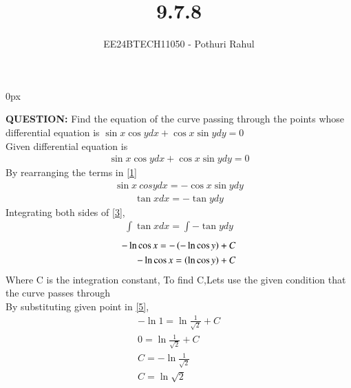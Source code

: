 \documentclass[journal]{IEEEtran}
\begin{document}

\vspace{3cm}
\parindent 0px

\title{9.7.8}
\author{EE24BTECH11050 - Pothuri Rahul}
{\let\newpage\relax\maketitle}

\renewcommand{\thefigure}{\theenumi}
\renewcommand{\thetable}{\theenumi}
\setlength{\intextsep}{10pt} %


\renewcommand{\thetable}{\theenumi}
\textbf{QUESTION: } Find the equation of the curve passing through the points 
 whose differential equation is $\sin{x} \cos{y}dx+\cos{x} \sin{y} dy =0$ \\
\solution 
Given differential equation is 
\begin{align}
\sin{x} \cos{y}dx+\cos{x} \sin{y} dy =0 \label{1}
\end{align}
By rearranging the terms in \eqref{1} 
\begin{align}
\sin{x} \ cos{y} dx = - \cos{x} \sin{y} dy \label{2}
\end{align}
\begin{align}
\tan{x} dx = - \tan{y} dy \label{3}
\end{align}
Integrating both sides of \eqref{3}, 
\begin{align}
\int \tan{x} dx = \int - \tan{y} dy \label{4}
\end{align}
\begin{align}
-\ln{\cos{x}} = - \left(-\ln{\cos{y}}\right) + C \label{5} \\
-\ln{\cos{x}} =  \left(\ln{\cos{y}}\right) + C \label{6}
\end{align}
Where C is the integration constant, To find C,Lets use the given condition that the curve passes through  \\
By substituting given point in \eqref{5},
\begin{align}
-\ln{1} = \ln{\frac{1}{\sqrt{2}}} + C \\ 
0 = \ln{\frac{1}{\sqrt{2}}} + C \\
C = -  \ln{\frac{1}{\sqrt{2}}} \\
C = \ln{\sqrt{2}} \label{10}
\end{align}
\end{document}
